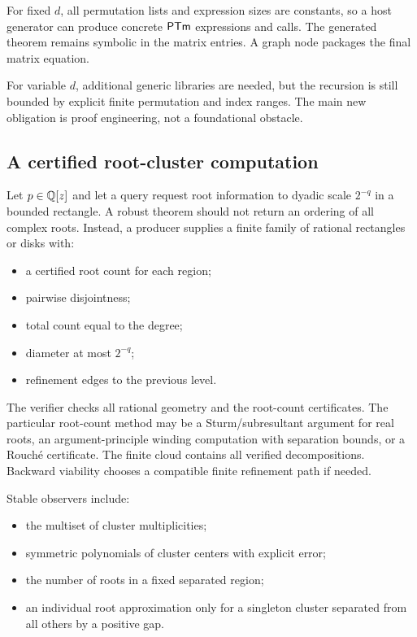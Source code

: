 For fixed \(d\), all permutation lists and expression sizes are constants, so a
host generator can produce concrete \(\mathsf{PTm}\) expressions and
 calls.  The generated theorem remains symbolic in the matrix
entries.  A graph node packages the final matrix equation.

For variable \(d\), additional generic libraries are needed, but the recursion
is still bounded by explicit finite permutation and index ranges.  The main
new obligation is proof engineering, not a foundational obstacle.

\subsection{A certified root-cluster computation}

Let \(p\in\mathbb Q[z]\) and let a query request root information to dyadic scale
\(2^{-q}\) in a bounded rectangle.  A robust theorem should not return an
ordering of all complex roots.  Instead, a producer supplies a finite family of
rational rectangles or disks with:

\begin{itemize}
\item a certified root count for each region;
\item pairwise disjointness;
\item total count equal to the degree;
\item diameter at most \(2^{-q}\);
\item refinement edges to the previous level.
\end{itemize}

The verifier checks all rational geometry and the root-count certificates.  The
particular root-count method may be a Sturm/subresultant argument for real
roots, an argument-principle winding computation with separation bounds, or a
Rouch\'e certificate.  The finite cloud contains all verified decompositions.
Backward viability chooses a compatible finite refinement path if needed.

Stable observers include:

\begin{itemize}
\item the multiset of cluster multiplicities;
\item symmetric polynomials of cluster centers with explicit error;
\item the number of roots in a fixed separated region;
\item an individual root approximation only for a singleton cluster separated
from all others by a positive gap.
\end{itemize}

